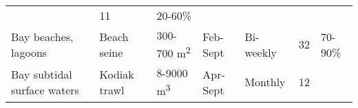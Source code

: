\documentclass[]{article}
\begin{document}
\begin{longtable}[]{@{}lllllll@{}}
\begin{minipage}[t]{0.12\columnwidth}
\end{minipage} & \begin{minipage}[t]{0.12\columnwidth}\raggedright\strut
11\strut
\end{minipage} & \begin{minipage}[t]{0.12\columnwidth}\raggedright\strut
20-60\%\strut
\end{minipage}\tabularnewline
\begin{minipage}[t]{0.12\columnwidth}\raggedright\strut
Bay beaches, lagoons\strut
\end{minipage} & \begin{minipage}[t]{0.12\columnwidth}\raggedright\strut
Beach seine\strut
\end{minipage} & \begin{minipage}[t]{0.12\columnwidth}\raggedright\strut
300-700 m\textsuperscript{2}\strut
\end{minipage} & \begin{minipage}[t]{0.12\columnwidth}\raggedright\strut
Feb-Sept\strut
\end{minipage} & \begin{minipage}[t]{0.12\columnwidth}\raggedright\strut
Bi-weekly\strut
\end{minipage} & \begin{minipage}[t]{0.12\columnwidth}\raggedright\strut
32\strut
\end{minipage} & \begin{minipage}[t]{0.12\columnwidth}\raggedright\strut
70-90\%\strut
\end{minipage}\tabularnewline
\begin{minipage}[t]{0.12\columnwidth}\raggedright\strut
Bay subtidal surface waters\strut
\end{minipage} & \begin{minipage}[t]{0.12\columnwidth}\raggedright\strut
Kodiak trawl\strut
\end{minipage} & \begin{minipage}[t]{0.12\columnwidth}\raggedright\strut
8-9000 m\textsuperscript{3}\strut
\end{minipage} & \begin{minipage}[t]{0.12\columnwidth}\raggedright\strut
Apr-Sept\strut
\end{minipage} & \begin{minipage}[t]{0.12\columnwidth}\raggedright\strut
Monthly\strut
\end{minipage} & \begin{minipage}[t]{0.12\columnwidth}\raggedright\strut
12\strut

\end{minipage}
\end{longtable}
\end{document}
